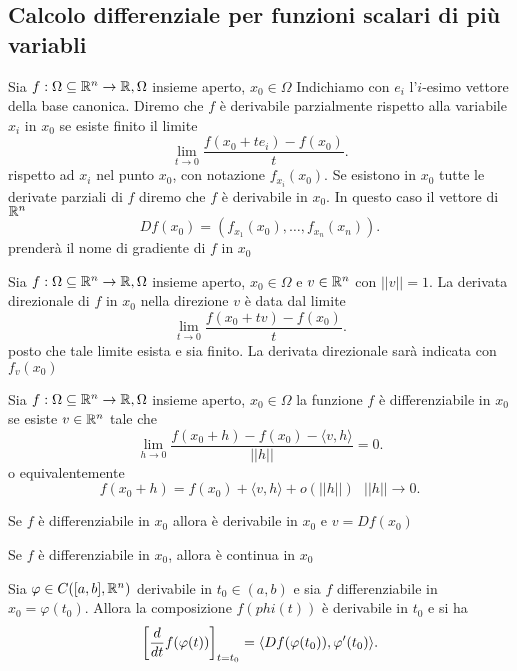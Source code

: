 \documentclass[12px]{article}
\begin{document}
	\subsection{Calcolo differenziale per funzioni scalari di più variabli}
	\begin{defi}
		Sia $f:\Omega\subseteq \mathbb{R}^n \rightarrow\mathbb{R}, \Omega$ insieme aperto, $x_0\in\Omega$ Indichiamo con $e_i$ l'$i$-esimo vettore della base canonica. Diremo che $f$ è derivabile parzialmente rispetto alla variabile $x_i$ in $x_0$ se esiste finito il limite
		\[
			\lim_{t \rightarrow 0}\frac{f(x_0 + t e_i)-f(x_0)} t
		.\] rispetto ad $x_i$ nel punto $x_0$, con notazione $f_{x_i}(x_0)$.
		Se esistono in $x_0$ tutte le derivate parziali di $f$ diremo che $f$ è derivabile in $x_0$. In questo caso il vettore di $\mathbb{R}^n$
		 \[
			 Df(x_0) = (f_{x_1}(x_0), \ldots, f_{x_n}(x_n)) .\] 
			 prenderà il nome di gradiente di $f$ in $x_0$
	\end{defi}
	\begin{defi}
		Sia $f:\Omega\subseteq\mathbb{R}^n \rightarrow \mathbb{R}, \Omega$ insieme aperto, $x_0\in\Omega$ e $v\in\mathbb{R}^n$ con $||v||=1$. La derivata direzionale di  $f$ in $x_0$ nella direzione $v$ è data dal limite
		\[
			\lim_{t \rightarrow 0}\frac{f(x_0 + t v)-f(x_0)} t
		.\]
		posto che tale limite esista e sia finito. La derivata direzionale sarà indicata con $f_v(x_0)$
	\end{defi}
	\begin{defi}[Differenziabilità]
		Sia $f:\Omega\subseteq\mathbb{R}^n \rightarrow\mathbb{R},\Omega$ insieme aperto, $x_0\in\Omega$ la funzione $f$ è differenziabile in $x_0$ se esiste $v\in\mathbb{R}^n$ tale che 
		\[
			\lim_{h \rightarrow 0}\frac{f(x_0 + h)-f(x_0) - \langle v, h \rangle } {||h||} = 0
		.\] 
		o equivalentemente
		\[
		f(x_0 + h ) = f(x_0) + \langle v, h \rangle  + o(||h||) \ \ \ ||h|| \rightarrow 0
		.\] 
	\end{defi}
	\begin{teo}
		Se $f$ è differenziabile in $x_0$ allora è derivabile in $x_0$ e $v = Df(x_0)$
	\end{teo}
	\begin{teo}
		Se $f$ è differenziabile in $x_0$, allora è continua in $x_0$
	\end{teo}
	\begin{teo}
		Sia $ \varphi\in C([a,b],\mathbb{R}^n)$ derivabile in $t_0\in(a,b)$ e sia $f$ differenziabile in $x_0 = \varphi (t_0)$. Allora la composizione $f( phi(t))$ è derivabile in $t_0$ e si ha
		\[
			\left[\frac{d }{d t} f( \varphi(t))\right]_{t = t_0} = \langle Df( \varphi(t_0)), \varphi'(t_0) \rangle 
		.\] 
	\end{teo}
\end{document}
